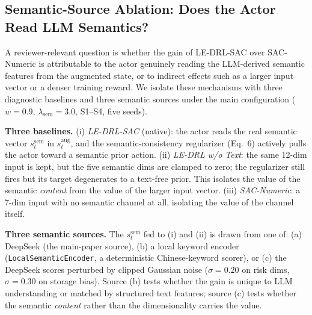 \documentclass{ieeeaccess}
\begin{document}
\subsection{Semantic-Source Ablation: Does the Actor Read LLM Semantics?}
\label{sec:m5_ablation}
A reviewer-relevant question is whether the gain of LE-DRL-SAC over SAC-Numeric is attributable to the actor genuinely reading the LLM-derived semantic features from the augmented state, or to indirect effects such as a larger input vector or a denser training reward. We isolate these mechanisms with three diagnostic baselines and three semantic sources under the main configuration ($w=0.9$, $\lambda_{\mathrm{sem}}=3.0$, S1--S4, five seeds).

\textbf{Three baselines.} (i) \emph{LE-DRL-SAC} (native): the actor reads the real semantic vector $s^{\mathrm{sem}}_t$ in $s^{\mathrm{aug}}_t$, and the semantic-consistency regularizer (Eq.~6) actively pulls the actor toward a semantic prior action. (ii) \emph{LE-DRL w/o Text}: the same 12-dim input is kept, but the five semantic dims are clamped to zero; the regularizer still fires but its target degenerates to a text-free prior. This isolates the value of the semantic \emph{content} from the value of the larger input vector. (iii) \emph{SAC-Numeric}: a 7-dim input with no semantic channel at all, isolating the value of the channel itself.

\textbf{Three semantic sources.} The $s^{\mathrm{sem}}_t$ fed to (i) and (ii) is drawn from one of: (a) DeepSeek (the main-paper source), (b) a local keyword encoder (\texttt{LocalSemanticEncoder}, a deterministic Chinese-keyword scorer), or (c) the DeepSeek scores perturbed by clipped Gaussian noise ($\sigma{=}0.20$ on risk dims, $\sigma{=}0.30$ on storage bias). Source (b) tests whether the gain is unique to LLM understanding or matched by structured text features; source (c) tests whether the semantic \emph{content} rather than the dimensionality carries the value.
\end{document}
